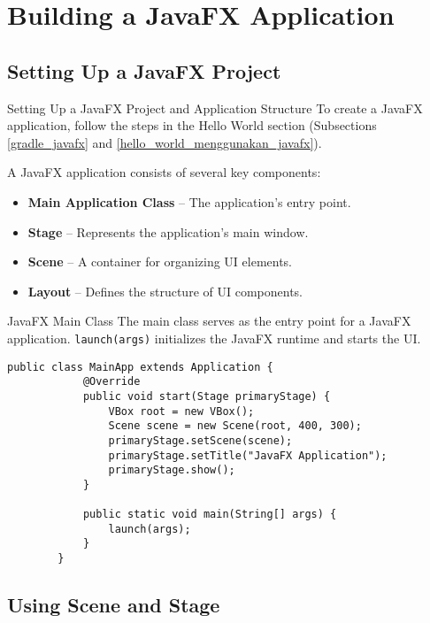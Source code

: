 \documentclass[aspectratio=169, table]{beamer}
\begin{document}
\section{Building a JavaFX Application}

\subsection{Setting Up a JavaFX Project}

\begin{frame}[fragile]{Setting Up a JavaFX Project and Application Structure}
	\vspace{20pt}
	To create a JavaFX application, follow the steps in the Hello World section  
	(Subsections \ref{gradle_javafx} and \ref{hello_world_menggunakan_javafx}).
	
	A JavaFX application consists of several key components:
	\begin{itemize}
		\item \textbf{Main Application Class} – The application's entry point.
		\item \textbf{Stage} – Represents the application's main window.
		\item \textbf{Scene} – A container for organizing UI elements.
		\item \textbf{Layout} – Defines the structure of UI components.
	\end{itemize}
\end{frame}


\begin{frame}[fragile]{JavaFX Main Class}
	\vspace{20pt}
	The main class serves as the entry point for a JavaFX application.  
	\texttt{launch(args)} initializes the JavaFX runtime and starts the UI.
	
	\begin{lstlisting}[style=JavaStyle]
		public class MainApp extends Application {
			@Override
			public void start(Stage primaryStage) {
				VBox root = new VBox();
				Scene scene = new Scene(root, 400, 300);
				primaryStage.setScene(scene);
				primaryStage.setTitle("JavaFX Application");
				primaryStage.show();
			}
			
			public static void main(String[] args) {
				launch(args);
			}
		}
	\end{lstlisting}
\end{frame}


\subsection{Using Scene and Stage}
\end{document}
